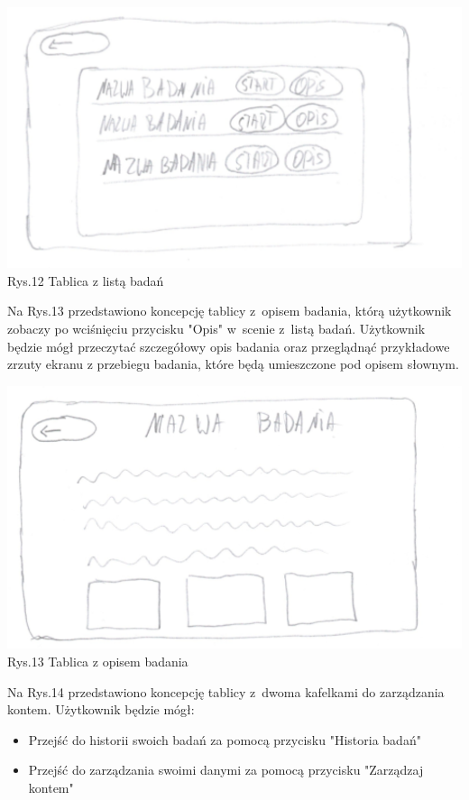 \documentclass[12pt, letterpaper]{article}
\begin{document}
		\begin{center}
			\includegraphics[scale=0.5]{GUI_lista_badan}\\
			\caption{Rys.12 Tablica z listą badań}
		\end{center}
		
		Na Rys.13 przedstawiono koncepcję tablicy z~opisem badania, którą użytkownik zobaczy po wciśnięciu przycisku "Opis" w~scenie z~listą badań. Użytkownik będzie mógł przeczytać szczegółowy opis badania oraz przeglądnąć przykładowe zrzuty ekranu z przebiegu badania, które będą umieszczone pod opisem słownym.
		
		\begin{center}
			\includegraphics[scale=0.5]{GUI_opis_badania}\\
			\caption{Rys.13 Tablica z opisem badania}
		\end{center}
		
		Na Rys.14 przedstawiono koncepcję tablicy z~dwoma kafelkami do zarządzania kontem. Użytkownik będzie mógł:
		
		\begin{itemize}
			\item Przejść do historii swoich badań za pomocą przycisku "Historia badań"
			\item Przejść do zarządzania swoimi danymi za pomocą przycisku "Zarządzaj kontem"
		\end{itemize}
		
\end{document}

